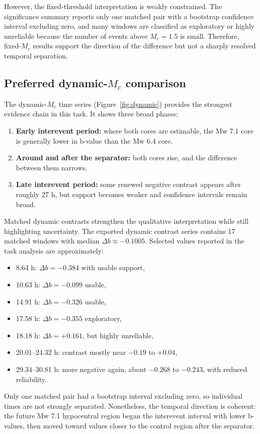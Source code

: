 \documentclass[11pt]{article}
\begin{document}
However, the fixed-threshold interpretation is weakly constrained. The significance summary reports only one matched pair with a bootstrap confidence interval excluding zero, and many windows are classified as exploratory or highly unreliable because the number of events above $M_c=1.5$ is small. Therefore, fixed-$M_c$ results support the direction of the difference but not a sharply resolved temporal separation.

\subsection{Preferred dynamic-$M_c$ comparison}
The dynamic-$M_c$ time series (Figure~\ref{fig:dynamic}) provides the strongest evidence chain in this task. It shows three broad phases:
\begin{enumerate}[leftmargin=1.5em]
    \item \textbf{Early interevent period:} where both cores are estimable, the Mw 7.1 core is generally lower in b-value than the Mw 6.4 core.
    \item \textbf{Around and after the separator:} both cores rise, and the difference between them narrows.
    \item \textbf{Late interevent period:} some renewed negative contrast appears after roughly 27 h, but support becomes weaker and confidence intervals remain broad.
\end{enumerate}

Matched dynamic contrasts strengthen the qualitative interpretation while still highlighting uncertainty. The exported dynamic contrast series contains 17 matched windows with median $\Delta b \approx -0.1005$. Selected values reported in the task analysis are approximately:
\begin{itemize}[leftmargin=1.5em]
    \item 8.64 h: $\Delta b=-0.384$ with usable support,
    \item 10.63 h: $\Delta b=-0.099$ usable,
    \item 14.91 h: $\Delta b=-0.326$ usable,
    \item 17.58 h: $\Delta b=-0.355$ exploratory,
    \item 18.18 h: $\Delta b=+0.161$, but highly unreliable,
    \item 20.01--24.32 h: contrast mostly near $-0.19$ to $+0.04$,
    \item 29.34--30.81 h: more negative again, about $-0.268$ to $-0.243$, with reduced reliability.
\end{itemize}
Only one matched pair had a bootstrap interval excluding zero, so individual times are not strongly separated. Nonetheless, the temporal direction is coherent: the future Mw 7.1 hypocentral region began the interevent interval with lower b-values, then moved toward values closer to the control region after the separator.
\end{document}
